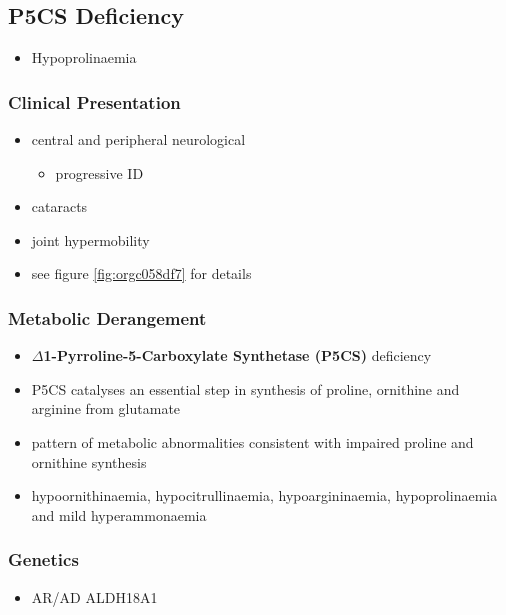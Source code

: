 \documentclass[12pt]{scrartcl}
\begin{document}
\begin{center}
\begin{center}
\subsection{P5CS  Deficiency}
\label{sec:org027775c}
\begin{itemize}
\item Hypoprolinaemia
\end{itemize}
\subsubsection{Clinical Presentation}
\label{sec:org501f228}
\begin{itemize}
\item central and peripheral neurological
\begin{itemize}
\item progressive ID
\end{itemize}
\item cataracts
\item joint hypermobility
\item see figure \ref{fig:orgc058df7} for details
\end{itemize}

\subsubsection{Metabolic Derangement}
\label{sec:org78587df}
\begin{itemize}
\item \textbf{\(\Delta\)1-Pyrroline-5-Carboxylate Synthetase (P5CS)} deficiency
\item P5CS catalyses an essential step in synthesis of proline, ornithine
and arginine from glutamate
\end{itemize}


\begin{itemize}
\item pattern of metabolic abnormalities consistent with impaired proline
and ornithine synthesis
\item hypoornithinaemia, hypocitrullinaemia, hypoargininaemia,
hypoprolinaemia and mild hyperammonaemia
\end{itemize}

\subsubsection{Genetics}
\label{sec:org83100f7}
\begin{itemize}
\item AR/AD ALDH18A1
\end{itemize}


\end{center}
\end{center}
\end{document}
